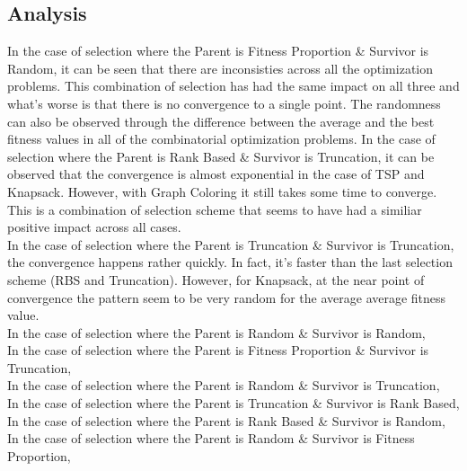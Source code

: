 \documentclass[11pt, letterpaper]{article}
\begin{document}
\subsection {Analysis}
In the case of selection where the Parent is Fitness Proportion \& Survivor is Random, it can be seen that there are inconsisties across all the optimization problems. This combination of selection has had the same impact on all three and what's worse is that there is no convergence to a single point. The randomness can also be observed through the difference between the average and the best fitness values in all of the combinatorial optimization problems.
In the case of selection where the Parent is Rank Based \& Survivor is Truncation, it can be observed that the convergence is almost exponential in the case of TSP and Knapsack. However, with Graph Coloring it still takes some time to converge. This is a combination of selection scheme that seems to have had a similiar positive impact across all cases.\\
In the case of selection where the Parent is Truncation \& Survivor is Truncation, the convergence happens rather quickly. In fact, it's faster than the last selection scheme (RBS and Truncation). However, for Knapsack, at the near point  of convergence the pattern seem to be very random for the average average fitness value.\\
In the case of selection where the Parent is Random \& Survivor is Random,\\
In the case of selection where the Parent is Fitness Proportion \& Survivor is Truncation,\\
In the case of selection where the Parent is Random \& Survivor is Truncation,\\
In the case of selection where the Parent is Truncation \& Survivor is Rank Based,\\
In the case of selection where the Parent is Rank Based \& Survivor is Random,\\
In the case of selection where the Parent is Random \& Survivor is Fitness Proportion,\\ 
\end{document}
